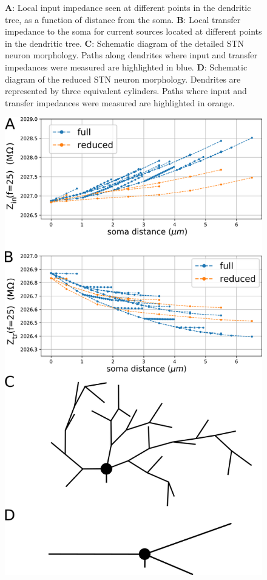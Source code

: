 \begin{figure}[ht]
{\textbf{A}: Local input impedance seen at different points in the dendritic tree, as a function
of distance from the soma.
\textbf{B}: Local transfer impedance to the soma for current sources located at different points
in the dendritic tree.
\textbf{C}: Schematic diagram of the detailed STN neuron morphology. Paths along dendrites where
input and transfer impedances were measured are highlighted in blue.
\textbf{D}: Schematic diagram of the reduced STN neuron morphology. Dendrites are represented by
three equivalent cylinders. Paths where input and transfer impedances were measured are highlighted
in orange.
}
\label{fig:stn-full-vs-red_Zin-Ztr}
\end{figure}


\begin{figure}[ht]
\centering
\includegraphics[height=\dimexpr \textheight - 9\baselineskip\relax]{ch_reduced_model/figs/fig_gpe-full-vs-red_Zin-Ztr.png}

\end{figure}
